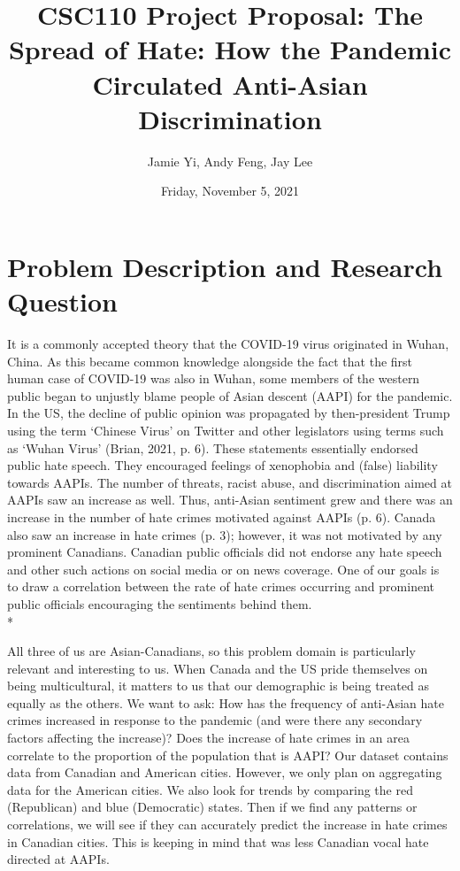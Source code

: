 \documentclass[fontsize=11pt]{article}
\title{CSC110 Project Proposal: The Spread of Hate: How the Pandemic Circulated Anti-Asian Discrimination}
\author{Jamie Yi, Andy Feng, Jay Lee}
\date{Friday, November 5, 2021}
\begin{document}
    \maketitle

    \section*{Problem Description and Research Question}

    \quad It is a commonly accepted theory that the COVID-19 virus originated in Wuhan, China. As this became common knowledge alongside the fact that the first human case of COVID-19 was also in Wuhan, some members of the western public began to unjustly blame people of Asian descent (AAPI) for the pandemic. In the US, the decline of public opinion was propagated by then-president Trump using the term ‘Chinese Virus’ on Twitter and other legislators using terms such as ‘Wuhan Virus’ (Brian, 2021, p. 6). These statements essentially endorsed public hate speech. They encouraged feelings of xenophobia and (false) liability towards AAPIs. The number of threats, racist abuse, and discrimination aimed at AAPIs saw an increase as well. Thus, anti-Asian sentiment grew and there was an increase in the number of hate crimes motivated against AAPIs (p. 6). Canada also saw an increase in hate crimes (p. 3); however, it was not motivated by any prominent Canadians. Canadian public officials did not endorse any hate speech and other such actions on social media or on news coverage. One of our goals is to draw a correlation between the rate of hate crimes occurring and prominent public officials encouraging the sentiments behind them.\\*

    All three of us are Asian-Canadians, so this problem domain is particularly relevant and interesting to us. When Canada and the US pride themselves on being multicultural, it matters to us that our demographic is being treated as equally as the others. We want to ask: How has the frequency of anti-Asian hate crimes increased in response to the pandemic (and were there any secondary factors affecting the increase)? Does the increase of hate crimes in an area correlate to the proportion of the population that is AAPI? Our dataset contains data from Canadian and American cities. However, we only plan on aggregating data for the American cities. We also look for trends by comparing the red (Republican) and blue (Democratic) states. Then if we find any patterns or correlations, we will see if they can accurately predict the increase in hate crimes in Canadian cities. This is keeping in mind that was less Canadian vocal hate directed at AAPIs.
\end{document}
